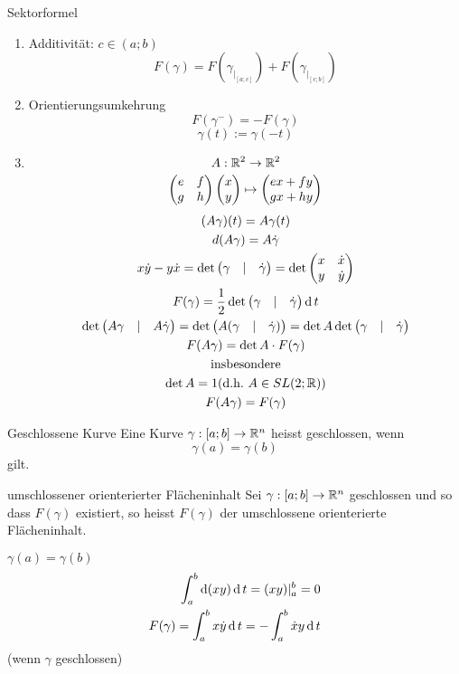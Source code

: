 \begin{Eig}{Sektorformel}
  \begin{enumerate}
    \item Additivität: $c\in(a;b)$
      \[F(\gamma)=F\left(\gamma_{|_{[a;c]}}\right)+F\left( \gamma_{|_{[c;b]}} \right)\]
    \item Orientierungsumkehrung
      \[F(\gamma^-)=-F(\gamma)\]
      \[\gamma(t):=\gamma(-t)\]
    \item
      \[A:\mathbb{R}^2\to\mathbb{R}^2\]
      \[\begin{pmatrix}e&f\\g&h\end{pmatrix}\begin{pmatrix}x\\y\end{pmatrix}\mapsto \begin{pmatrix}ex+fy\\gx+hy\end{pmatrix}\]
      \begin{gather*}
        (A\gamma)(t)=A\gamma(t)\\
        d(A\gamma)=A\dot\gamma\\
        x\dot y-y\dot x=\det\begin{pmatrix}\gamma&|&\dot\gamma\end{pmatrix}=\det\begin{pmatrix}x&\dot x\\y&\dot y\end{pmatrix}\\
        F(\gamma)=\frac{1}{2}\det\begin{pmatrix}\gamma&|&\dot\gamma\end{pmatrix}\operatorname{d} t\\
        \det\begin{pmatrix}A\gamma&|&A\dot\gamma\end{pmatrix}=\det\begin{pmatrix}A(\gamma&|&\dot\gamma)\end{pmatrix}=\det A\det\begin{pmatrix}\gamma&|&\dot\gamma\end{pmatrix}\\
        F(A\gamma)=\det A\cdot F(\gamma)\\
        \text{insbesondere}\\
        \det A=1(\text{d.h.}\ A\in SL(2;\mathbb{R}))\\
        F(A\gamma)=F(\gamma)
      \end{gather*}
  \end{enumerate}
\end{Eig}
\begin{Def}{Geschlossene Kurve}
  Eine Kurve $\gamma:[a;b]\to\mathbb{R}^n$ heisst geschlossen, wenn
  \[\gamma(a)=\gamma(b)\]
  gilt.
\end{Def}
\begin{Def}{umschlossener orienterierter Flächeninhalt}
  Sei $\gamma:[a;b]\to\mathbb{R}^n$ geschlossen und so dass $F(\gamma)$ existiert, so heisst $F(\gamma)$ der umschlossene orienterierte Flächeninhalt.
\end{Def}
\begin{Bem}
  $\gamma(a)=\gamma(b)$
  \begin{align*}
    \int_a^b\operatorname{d} (xy)\operatorname{d} t=(xy)|^b_a=0\\
    F(\gamma)=\int^b_ax\dot y\operatorname{d} t=-\int^b_a\dot x y\operatorname{d} t
  \end{align*}
  (wenn $\gamma$ geschlossen)
\end{Bem}
